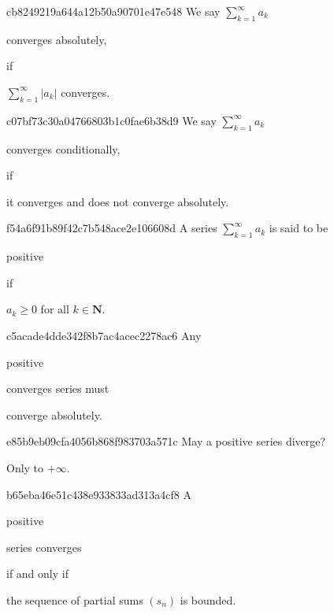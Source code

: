 \begin{note}{cb8249219a644a12b50a90701e47e548}
    We say \({ \sum_{k=1}^{\infty} a_k }\) \begin{icloze}{2}converges absolutely,\end{icloze} if \begin{icloze}{1}\({ \sum_{k=1}^{\infty} \left\lvert a_k \right\rvert }\) converges.\end{icloze}
\end{note}

\begin{note}{c07bf73c30a04766803b1c0fae6b38d9}
    We say \({ \sum_{k=1}^{\infty} a_k }\) \begin{icloze}{2}converges conditionally,\end{icloze} if \begin{icloze}{1}it converges and does not converge absolutely.\end{icloze}
\end{note}

\begin{note}{f54a6f91b89f42c7b548ace2e106608d}
    A series \({ \sum_{k=1}^{\infty} a_k }\) is said to be \begin{icloze}{2}positive\end{icloze} if \begin{icloze}{1}\({ a_k \geq 0 }\) for all \({ k \in \mathbf{N} }\).\end{icloze}
\end{note}

\begin{note}{c5acade4dde342f8b7ac4acec2278ac6}
    Any \begin{icloze}{2}positive\end{icloze} converges series must \begin{icloze}{1}converge absolutely.\end{icloze}
\end{note}

\begin{note}{e85b9eb09cfa4056b868f983703a571c}
    May a positive series diverge?

    \begin{cloze}{1}
        Only to \({ +\infty }\).
    \end{cloze}
\end{note}

\begin{note}{b65eba46e51c438e933833ad313a4cf8}
    A \begin{icloze}{2}positive\end{icloze} series converges \begin{icloze}{3}if and only if\end{icloze} \begin{icloze}{1}the sequence of partial sums \({ (s_n) }\) is bounded.\end{icloze}
\end{note}

